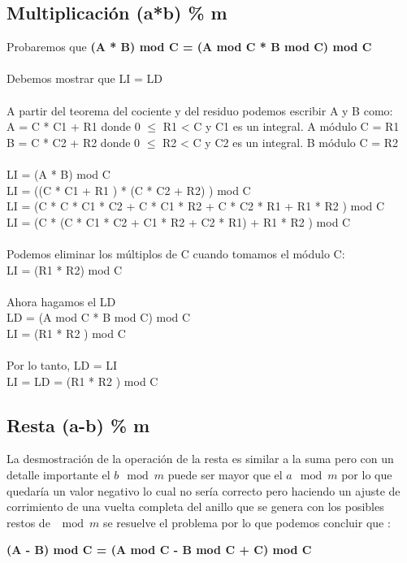 \subsection{Multiplicación (a*b) \% m}

Probaremos que \textbf{(A * B) mod C = (A mod C * B mod C) mod C}\\
\\
Debemos mostrar que LI = LD\\
\\
A partir del teorema del cociente y del residuo podemos escribir A y B como:\\
A = C * C1 + R1 donde 0 $\leq$ R1 <  C y C1 es un integral. A módulo C = R1\\
B = C * C2 + R2 donde 0 $\leq$ R2 <  C y C2 es un integral. B módulo C = R2\\
\\
LI = (A * B) mod C\\
LI = ((C * C1 + R1 ) * (C * C2 + R2) ) mod C\\
LI = (C * C * C1 * C2 + C * C1 * R2 + C * C2 * R1 + R1 * R2 )  mod C\\
LI = (C * (C * C1 * C2 + C1 * R2 + C2 * R1)  + R1 * R2 )  mod C\\
\\
Podemos eliminar los múltiplos de C cuando tomamos el módulo C:\\
LI = (R1 * R2) mod C\\
\\
Ahora hagamos el LD\\
LD = (A mod C * B mod C) mod C\\
LI = (R1 * R2 ) mod C\\
\\
Por lo tanto, LD = LI\\
LI = LD = (R1 * R2 ) mod C\\
\subsection{Resta (a-b) \% m}

La desmostración de la operación de la resta es similar a la suma pero con un detalle importante el $b \mod m $ puede ser mayor que el $a \mod m$ por lo que quedaría un valor negativo lo cual no sería correcto pero haciendo un ajuste de corrimiento de una vuelta completa del anillo que se genera con los posibles restos de  $\mod m$ se resuelve el problema por lo que podemos concluir que :

 {\centering\textbf{ (A - B) mod C = (A mod C - B mod C + C) mod C}}
 
